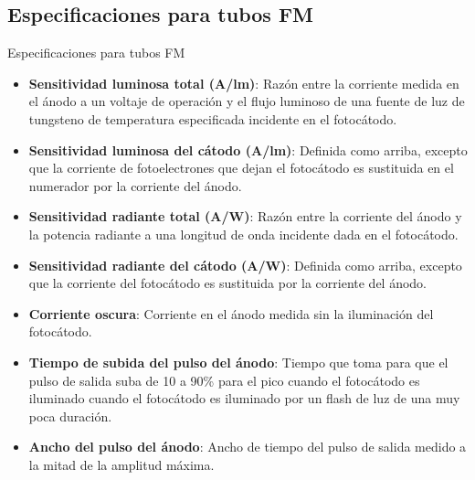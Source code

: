 \documentclass[a4paper,10pt]{beamer}
\begin{document}
\subsection{Especificaciones para tubos FM}
\begin{frame}{Especificaciones para tubos FM}

\begin{small}
\begin{itemize}[<+->]
 \item \begin{justify}
        \textbf{Sensitividad luminosa total (A/lm)}: Razón entre la corriente medida en el
        ánodo a un voltaje de operación y el flujo luminoso de una fuente de luz de 
        tungsteno de temperatura especificada incidente en el fotocátodo.
       \end{justify}
 \item \begin{justify}
        \textbf{Sensitividad luminosa del cátodo (A/lm)}: Definida como arriba, 
        excepto que la corriente de fotoelectrones que dejan el fotocátodo 
        es sustituida en el numerador por la corriente del ánodo.
       \end{justify}
 \item \begin{justify}
        \textbf{Sensitividad radiante total (A/W)}: Razón entre la corriente 
        del ánodo y la potencia radiante a una longitud de onda incidente dada 
        en el fotocátodo.
       \end{justify}
 \item \begin{justify}
        \textbf{Sensitividad radiante del cátodo (A/W)}: Definida como arriba, excepto 
        que la corriente del fotocátodo es sustituida por la corriente del ánodo.
       \end{justify}
 \item \begin{justify}
        \textbf{Corriente oscura}: Corriente en el ánodo medida sin la iluminación 
        del fotocátodo. 
       \end{justify}
 \item \begin{justify}
        \textbf{Tiempo de subida del pulso del ánodo}: Tiempo que toma para que el 
        pulso de salida suba de 10 a 90\% para el pico cuando el fotocátodo es 
        iluminado cuando el fotocátodo es iluminado por un flash de luz de una 
        muy poca duración.
       \end{justify}
 \item \begin{justify}
        \textbf{Ancho del pulso del ánodo}: Ancho de tiempo del pulso de salida 
        medido a la mitad de la amplitud máxima.
       \end{justify}
\end{itemize}
\end{small}
 
\end{frame}
\end{document}
